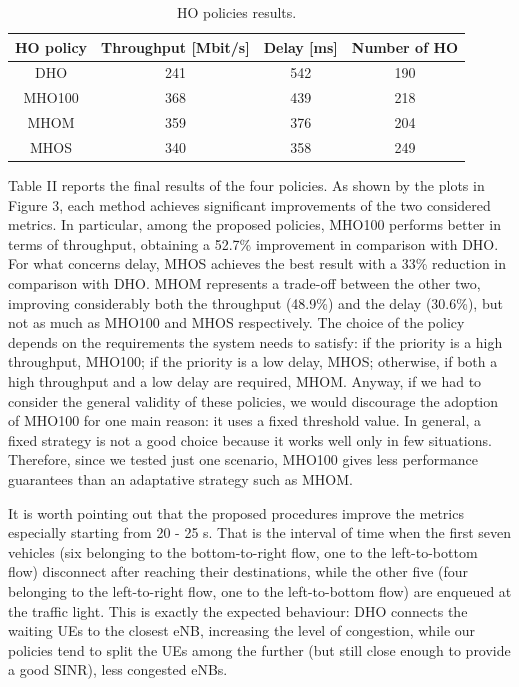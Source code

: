 \documentclass[conference,10pt]{IEEEtran}
\begin{document}
\begin{table}[t]
	\vspace*{9pt}
	\begin{center}
		\begin{tabular}{cccc}
			\toprule
			HO policy & Throughput [Mbit/s] & Delay [ms] & Number of HO \\
			\midrule
			DHO & 241 & 542 & 190 \\
			MHO100 & 368 & 439 & 218 \\
			MHOM & 359 & 376 & 204 \\
			MHOS & 340 & 358 & 249 \\			
			\bottomrule
		\end{tabular}
	\end{center}
		\caption{HO policies results.}
	\vspace*{-6.5pt}
\end{table}
Table II reports the final results of the four policies. As shown by the plots in Figure 3, each method achieves significant improvements of the two considered metrics. In particular, among the proposed policies, MHO100 performs better in terms of throughput, obtaining a 52.7\% improvement in comparison with DHO. For what concerns delay, MHOS achieves the best result with a 33\% reduction in comparison with DHO. MHOM represents a trade-off between the other two, improving considerably both the throughput (48.9\%) and the delay (30.6\%), but not as much as MHO100 and MHOS respectively. The choice of the policy depends on the requirements the system needs to satisfy: if the priority is a high throughput, MHO100; if the priority is a low delay, MHOS; otherwise, if both a high throughput and a low delay are required, MHOM. Anyway, if we had to consider the general validity of these policies, we would discourage the adoption of MHO100 for one main reason: it uses a fixed threshold value. In general, a fixed strategy is not a good choice because it works well only in few situations. Therefore, since we tested just one scenario, MHO100 gives less performance guarantees than an adaptative strategy such as MHOM.

It is worth pointing out that the proposed procedures improve the metrics especially starting from 20 - 25 s. That is the interval of time when the first seven vehicles (six belonging to the bottom-to-right flow, one to the left-to-bottom flow) disconnect after reaching their destinations, while the other five (four belonging to the left-to-right flow, one to the left-to-bottom flow) are enqueued at the traffic light. This is exactly the expected behaviour: DHO connects the waiting UEs to the closest eNB, increasing the level of congestion, while our policies tend to split the UEs among the further (but still close enough to provide a good SINR), less congested eNBs.
\end{document}
